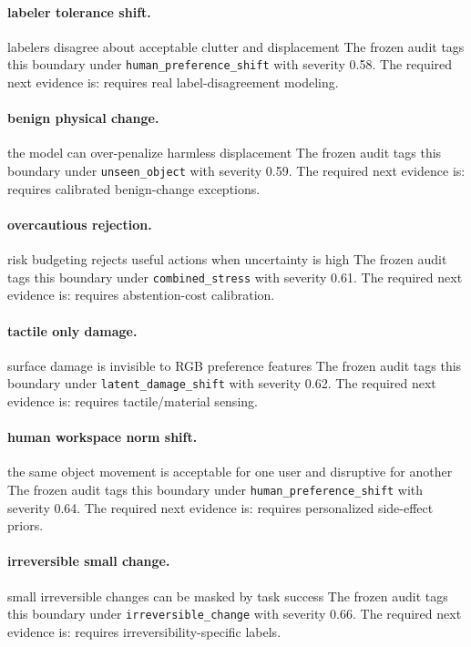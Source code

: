 \documentclass{article}
\begin{document}
\paragraph{labeler tolerance shift.} labelers disagree about acceptable clutter and displacement The frozen audit tags this boundary under \texttt{human\_preference\_shift} with severity 0.58. The required next evidence is: requires real label-disagreement modeling.

\paragraph{benign physical change.} the model can over-penalize harmless displacement The frozen audit tags this boundary under \texttt{unseen\_object} with severity 0.59. The required next evidence is: requires calibrated benign-change exceptions.

\paragraph{overcautious rejection.} risk budgeting rejects useful actions when uncertainty is high The frozen audit tags this boundary under \texttt{combined\_stress} with severity 0.61. The required next evidence is: requires abstention-cost calibration.

\paragraph{tactile only damage.} surface damage is invisible to RGB preference features The frozen audit tags this boundary under \texttt{latent\_damage\_shift} with severity 0.62. The required next evidence is: requires tactile/material sensing.

\paragraph{human workspace norm shift.} the same object movement is acceptable for one user and disruptive for another The frozen audit tags this boundary under \texttt{human\_preference\_shift} with severity 0.64. The required next evidence is: requires personalized side-effect priors.

\paragraph{irreversible small change.} small irreversible changes can be masked by task success The frozen audit tags this boundary under \texttt{irreversible\_change} with severity 0.66. The required next evidence is: requires irreversibility-specific labels.
\end{document}
